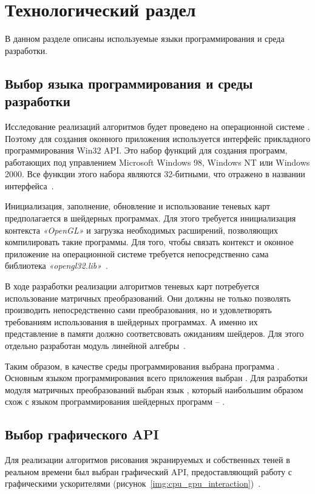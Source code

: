 \chapter{Технологический раздел}

В данном разделе описаны используемые языки программирования и среда
разработки.

\section{Выбор языка программирования и среды разработки}

Исследование реализаций алгоритмов будет проведено на операционной системе
. Поэтому для создания оконного приложения используется
интерфейс прикладного программирования Win32 API. Это набор функций
для создания программ, работающих под управлением Microsoft Windows 98,
Windows NT или Windows 2000. Все функции этого набора являются 32-битными,
что отражено в названии интерфейса~\cite{Win32Api_Shupak}.

Инициализация, заполнение, обновление и использование теневых карт
предполагается в шейдерных программах. Для этого требуется инициализация
контекста \textit{«OpenGL»} и загрузка необходимых расширений, 
позволяющих компилировать такие программы. Для того,
чтобы связать контекст и оконное приложение на операционной системе
 требуется непосредственно сама библиотека
\textit{«opengl32.lib»}~\cite{extOpenGL}.

В ходе разработки реализации алгоритмов теневых карт потребуется
использование матричных преобразований. Они должны не только позволять
производить непосредственно сами преобразования, но и удовлетворять
требованиям использования в шейдерных программах. А именно их представление
в памяти должно соответсвовать ожиданиям шейдеров. Для этого отдельно
разработан модуль линейной алгебры~\cite{Linal}.

Таким образом, в качестве среды программирования выбрана программа
. Основным языком программирования всего приложения
выбран . Для разработки модуля матричных преобразований выбран язык
, который наибольшим образом схож с языком программирования шейдерных
программ -- .

\section{Выбор графического API}

Для реализации алгоритмов рисования экранируемых и собственных теней в реальном времени
был выбран графический API, предоставляющий работу с графическими
ускорителями (\hbox{рисунок~\ref{img:cpu_gpu_interaction}})~\cite{extOpenGL}.

